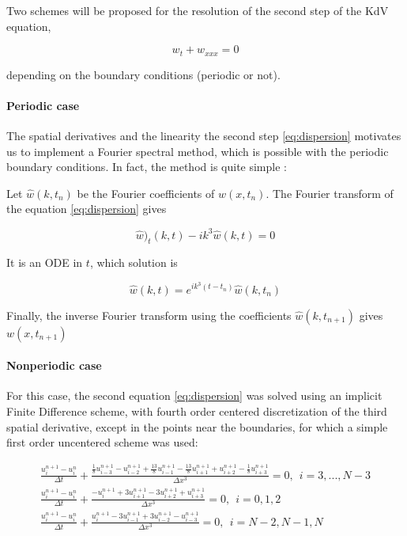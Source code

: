 \indent Two schemes will be proposed for the resolution of the second step of the KdV equation,

\begin{equation}
	\label{eq:dispersion}
	w_t + w_{xxx} = 0
\end{equation}

\noindent depending on the boundary conditions (periodic or not).

\paragraph{Periodic case}

\indent The spatial derivatives and the linearity the second step \eqref{eq:dispersion} motivates us to implement a Fourier spectral method, which is possible with the periodic boundary conditions. In fact, the method is quite simple :

\indent Let $\hat{w}(k,t_n)$ be the Fourier coefficients of $w(x,t_n)$.  The Fourier transform of the equation \eqref{eq:dispersion} gives

\begin{equation}
	\hat{w})_t(k,t) - ik^3\hat{w}(k,t) = 0
\end{equation}

\indent It is an ODE in $t$,  which solution is

\begin{equation}
\hat{w}(k,t) = e^{ik^3(t-t_n)}\hat{w}(k,t_n)
\end{equation}

\indent Finally, the inverse Fourier transform using the coefficients $\hat{w}(k,t_{n+1})$ gives $w(x,t_{n+1})$

\paragraph{Nonperiodic case}

\indent For this case, the second equation \eqref{eq:dispersion} was solved using an implicit Finite Difference scheme, with fourth order centered discretization of the third spatial derivative, except in the points near the boundaries, for which a simple first order uncentered scheme was used:

\begin{equation}
	\label{eq:IFDSolverKdV}
	\begin{split}
	\frac{u_i^{n+1} - u_i^n}{\Delta t} + \frac{\frac{1}{8}u_{i-3}^{n+1} - u_{i-2}^{n+1}  + \frac{13}{8}u_{i-1}^{n+1} - \frac{13}{8}u_{i+1}^{n+1} + u_{i+2}^{n+1} - \frac{1}{8}u_{i+3}^{n+1}}{\Delta x^3} = 0, \ \ i = 3,...,N-3 \\
	\frac{u_i^{n+1} - u_i^n}{\Delta t}  + \frac{-u_{i}^{n+1} + 3u_{i+1}^{n+1}  -3 u_{i+2}^{n+1} + u_{i+3}^{n+1} }{\Delta x^3} = 0, \ \ i = 0,1,2 \\
	\frac{u_i^{n+1} - u_i^n}{\Delta t}  + \frac{u_{i}^{n+1} - 3u_{i-1}^{n+1}  + 3 u_{i-2}^{n+1} - u_{i-3}^{n+1} }{\Delta x^3} = 0, \ \ i = N-2,N-1,N \\
	\end{split}
\end{equation} 

